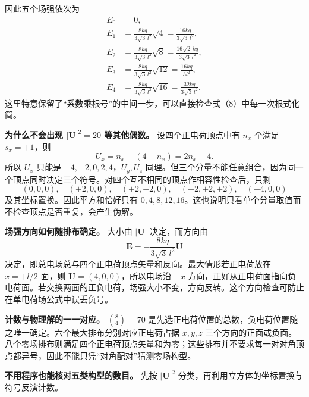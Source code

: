\documentclass[12pt,a4paper,UTF8]{ctexart}
\begin{document}
因此五个场强依次为 \[
\begin{aligned}
E_0&=0,\\
E_1&=\frac{8kq}{3\sqrt3\,l^2}\sqrt4
=\frac{16kq}{3\sqrt3\,l^2},\\
E_2&=\frac{8kq}{3\sqrt3\,l^2}\sqrt8
=\frac{16\sqrt2\,kq}{3\sqrt3\,l^2},\\
E_3&=\frac{8kq}{3\sqrt3\,l^2}\sqrt{12}
=\frac{16kq}{3l^2},\\
E_4&=\frac{8kq}{3\sqrt3\,l^2}\sqrt{16}
=\frac{32kq}{3\sqrt3\,l^2}.
\end{aligned}
\]
这里特意保留了``系数乘根号''的中间一步，可以直接检查式（8）中每一次根式化简。

\textbf{为什么不会出现 \(|\boldsymbol U|^2=20\) 等其他偶数。}
设四个正电荷顶点中有 \(n_x\) 个满足 \(s_x=+1\)，则 \[
U_x=n_x-(4-n_x)=2n_x-4.
\] 所以 \(U_x\) 只能是 \(-4,-2,0,2,4\)，\(U_y,U_z\)
同理。但三个分量不能任意组合，因为同一个顶点同时决定三个符号。对四个互不相同的顶点作相容性检查后，只剩
\[
(0,0,0),\quad
(\pm2,0,0),\quad
(\pm2,\pm2,0),\quad
(\pm2,\pm2,\pm2),\quad
(\pm4,0,0)
\] 及其坐标置换。因此平方和恰好只有
\(0,4,8,12,16\)。这也说明只看单个分量取值而不检查顶点是否重复，会产生伪解。

\textbf{场强方向如何随排布确定。} 大小由 \(|\boldsymbol U|\)
决定，而方向由 \[
\boldsymbol E=-\frac{8kq}{3\sqrt3\,l^2}\boldsymbol U
\] 决定，即总电场总与四个正电荷顶点矢量和反向。最大情形若正电荷放在
\(x=+l/2\) 面，则 \(\boldsymbol U=(4,0,0)\)，所以电场沿 \(-x\)
方向，正好从正电荷面指向负电荷面。若交换两面的正负电荷，场强大小不变，方向反转。这个方向检查可防止在单电荷场公式中误丢负号。

\textbf{计数与物理解的一一对应。} \(\binom84=70\)
是先选正电荷位置的总数，负电荷位置随之唯一确定。六个最大排布分别对应正电荷占据
\(x,y,z\)
三个方向的正面或负面。八个零场排布则满足四个正电荷顶点矢量和为零；这些排布并不要求每一对对角顶点都异号，因此不能只凭``对角配对''猜测零场构型。

\textbf{不用程序也能核对五类构型的数目。} 先按 \(|\boldsymbol U|^2\)
分类，再利用立方体的坐标置换与符号反演计数。
\end{document}

